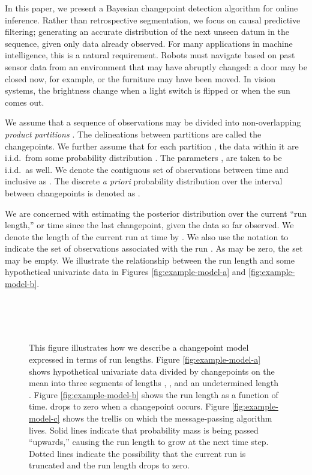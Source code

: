 \documentclass[]{article}
\begin{document}
    In this paper, we present a Bayesian changepoint detection algorithm
    for online inference.  Rather than retrospective segmentation, we focus
    on causal predictive filtering; generating an accurate distribution of
    the next unseen datum in the sequence, given only data already
    observed.  For many applications in machine intelligence, this is a
    natural requirement.  Robots must navigate based on past sensor data
    from an environment that may have abruptly changed: a door may be
    closed now, for example, or the furniture may have been moved.  In
    vision systems, the brightness change when a light switch is flipped or
    when the sun comes out.

    We assume that a sequence of observations 
    may be divided into non-overlapping \textit{product partitions}
    \cite{barry-hartigan-1992a}.  The delineations between partitions are
    called the changepoints.  We further assume that for each partition
    , the data within it are i.i.d.\ from some probability
    distribution .  The parameters
    ,  are taken to be i.i.d.\ as well.
    We denote the contiguous set of observations between time  and 
    inclusive as .  The discrete \textit{a priori} probability
    distribution over the interval between changepoints is denoted as
    .

    We are concerned with estimating the posterior distribution over the
    current ``run length,'' or time since the last changepoint, given the
    data so far observed.  We denote the length of the current run at time
     by .  We also use the notation  to indicate
    the set of observations associated with the run .  As  may be
    zero, the set  may be empty.  We illustrate the relationship
    between the run length  and some hypothetical univariate data in
    Figures \ref{fig:example-model-a} and \ref{fig:example-model-b}.

    \begin{figure}[!t]
      \centering 
      \\
      \\
      \\
      \caption{This figure illustrates how we describe a changepoint model
      expressed in terms of run lengths.  Figure \ref{fig:example-model-a}
      shows hypothetical univariate data divided by changepoints on the
      mean into three segments of lengths , , and an
      undetermined length .  Figure \ref{fig:example-model-b} shows
      the run length  as a function of time.  drops to zero
      when a changepoint occurs.  Figure \ref{fig:example-model-c} shows
      the trellis on which the message-passing algorithm lives.  Solid
      lines indicate that probability mass is being passed ``upwards,''
      causing the run length to grow at the next time step.  Dotted lines
      indicate the possibility that the current run is truncated and the
      run length drops to zero.}
      \label{fig:example-model}
    \end{figure}
\end{document}
